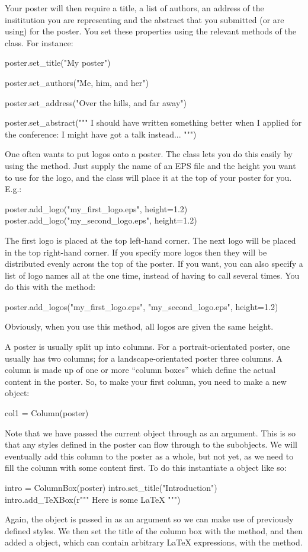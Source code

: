 Your poster will then require a title, a list of authors, an address of the
insititution you are representing and the abstract that you submitted (or
are using) for the poster.  You set these properties using the relevant
 methods of the  class.  For instance:
\begin{python}
poster.set_title("My poster")

poster.set_authors("Me, him, and her")

poster.set_address("Over the hills, and far away")

poster.set_abstract("""
I should have written something better when I applied for the conference: I
might have got a talk instead...
""")
\end{python}

One often wants to put logos onto a poster.  The  class lets
you do this easily by using the  method.  Just supply the
name of an EPS file and the height you want to use for the logo, and the
class will place it at the top of your poster for you.  E.g.:
\begin{python}
poster.add_logo("my_first_logo.eps", height=1.2)
poster.add_logo("my_second_logo.eps", height=1.2)
\end{python}
The first logo is placed at the top left-hand corner.  The next logo will be
placed in the top right-hand corner.  If you specify more logos then they
will be distributed evenly across the top of the poster.  If you want, you
can also specify a list of logo names all at the one time, instead of having
to call  several times.  You do this with the
 method:
\begin{python}
poster.add_logos("my_first_logo.eps", "my_second_logo.eps", height=1.2)
\end{python}
Obviously, when you use this method, all logos are given the same height.

A poster is usually split up into columns.  For a portrait-orientated
poster, one usually has two columns; for a landscape-orientated poster three
columns.  A column is made up of one or more ``column boxes'' which define
the actual content in the poster.  So, to make your first column, you need
to make a new  object:
\begin{python}
col1 = Column(poster)
\end{python}
Note that we have passed the current  object through as an
argument.  This is so that any styles defined in the poster can flow through
to the subobjects.  We will eventually add this column to the poster as a
whole, but not yet, as we need to fill the column with some content first.
To do this instantiate a  object like so:
\begin{python}
intro = ColumnBox(poster)
intro.set_title("Introduction")
intro.add_TeXBox(r"""
Here is some \LaTeX{}
""")
\end{python}
Again, the  object is passed in as an argument so we can make
use of previously defined styles.  We then set the title of the column box
with the  method, and then added a  object,
which can contain arbitrary \LaTeX{} expressions, with the
 method.

